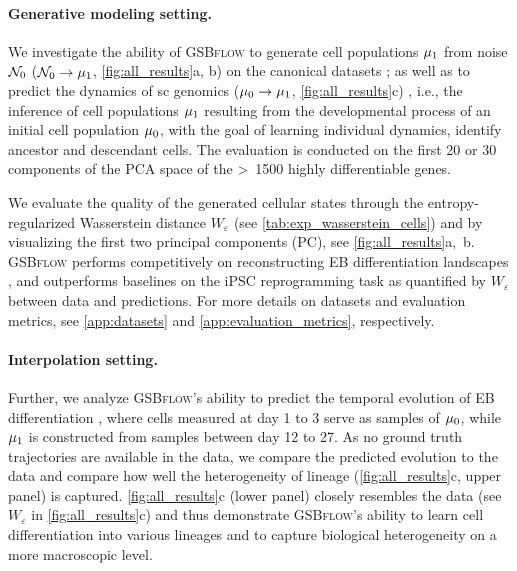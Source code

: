 \paragraph{Generative modeling setting.}
 We investigate the ability of \textsc{GSBflow} to generate cell populations $\mu_1$ from noise $\mathcal{N}_0$ ($\mathcal{N}_0 \rightarrow \mu_1$, \cref{fig:all_results}a, b) on the canonical datasets \citep{moon2019visualizing, schiebinger2019optimal}; as well as to predict the dynamics of \acrlong{sc} genomics ($\mu_0 \rightarrow \mu_1$, \cref{fig:all_results}c) \citep{moon2019visualizing}, i.e., the inference of cell populations $\mu_1$ resulting from the developmental process of an initial cell population $\mu_0$, with the goal of learning individual dynamics, identify ancestor and descendant cells. 
The evaluation is conducted on the first 20 or 30 components of the \acrshort{PCA} space of the >~1500 highly differentiable genes.

 We evaluate the quality of the generated cellular states through the entropy-regularized Wasserstein distance $W_\varepsilon$
(see \cref{tab:exp_wasserstein_cells}) and by visualizing the first two principal components (PC), see \cref{fig:all_results}a,~b.
\textsc{GSBflow} performs competitively on reconstructing \acrshort{EB} differentiation landscapes \citep{moon2019visualizing}, and outperforms  baselines on the \acrlong{iPSC} reprogramming task \citep{schiebinger2019optimal} as quantified by $W_\varepsilon$ between data and predictions.
For more details on datasets and evaluation metrics, see \cref{app:datasets} and \cref{app:evaluation_metrics}, respectively.

\paragraph{Interpolation setting.}
Further, we analyze \textsc{GSBflow}'s ability to predict the temporal evolution of \acrshort{EB} differentiation \citep{moon2019visualizing}, where cells measured at day 1 to 3 serve as samples of $\mu_0$, while $\mu_1$ is constructed from samples between day 12 to 27. As no ground truth trajectories are available in the data, we compare the predicted evolution to the data and compare how well the heterogeneity of lineage (\cref{fig:all_results}c, upper panel) is captured.
\cref{fig:all_results}c (lower panel) closely resembles the data (see $W_\varepsilon$ in \cref{fig:all_results}c) and thus demonstrate \textsc{GSBflow}'s ability to learn cell differentiation into various lineages and to capture biological heterogeneity on a more macroscopic level.

